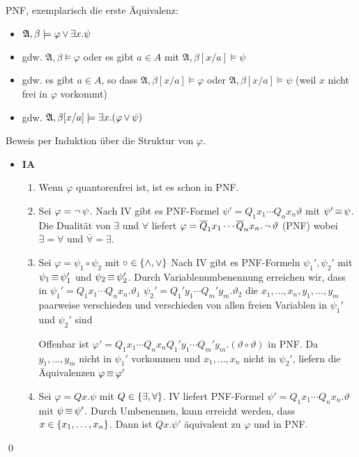 PNF, exemplarisch die erste Äquivalenz:

\begin{itemize}
  \item $\mathfrak{A}, \beta \models \varphi \operatorname{\vee} \exists x.\psi$
  \item gdw. $\mathfrak{A}, \beta \models \varphi$ oder es gibt $a\in A$ mit $\mathfrak{A}, \beta[x/a] \models \psi$
  \item gdw. es gibt $a\in A$, so dass $\mathfrak{A}, \beta[x/a] \models \varphi$ oder $\mathfrak{A}, \beta[x/a] \models \psi$ (weil $x$ nicht frei in $\varphi$ vorkommt)
  \item gdw. $\mathfrak{A}, \beta[x/a] \models \exists x.(\varphi \operatorname{\vee} \psi)$
\end{itemize}

Beweis per Induktion über die Struktur von $\varphi$.
\begin{itemize}
  \item \textbf{IA}
  \begin{enumerate}
    \item Wenn $\varphi$ quantorenfrei ist, ist es schon in PNF.
    \item Sei $\varphi = \operatorname{\neg}\psi$. Nach IV gibt es PNF-Formel $\psi' = Q_1x_1\cdots Q_nx_n \vartheta$ mit $\psi' \operatorname{\equiv} \psi$. Die Dualität von $\exists$ und $\forall$ liefert
      $\varphi = \overline{Q}_1x_1 \cdots \overline{Q}_nx_n.\operatorname{\neg}\vartheta$ (PNF)
    wobei $\overline{\exists}=\forall$ und $\overline{\forall}=\exists$.
    
    \item Sei $\varphi = \psi_1 \circ \psi_2$ mit $\circ\in\left\{\operatorname{\wedge},\operatorname{\vee}\right\}$
    Nach IV gibt es PNF-Formeln $\psi_1', \psi_2'$ mit $\psi_1 \operatorname{\equiv} \psi_1'$
    und $\psi_2 \operatorname{\equiv} \psi_2'$. Durch Variablenumbenennung erreichen wir, dass in
      $\psi_1' = Q_1x_1 \cdots Q_nx_n. \vartheta_1$
      $\psi_2' = Q_1'y_1 \cdots Q_m'y_m. \vartheta_2$
    die $x_1,\dots,x_n, y_1,\dots,y_m$ paarweise verschieden und verschieden von allen freien Variablen in $\psi_1'$ und $\psi_2'$ sind
    
    Offenbar ist
      $\varphi' = Q_1x_1\cdots Q_nx_n Q_1'y_1 \cdots Q_m'y_m .(\vartheta\circ\vartheta)$
    in PNF. Da $y_1,\dots,y_m$ nicht in $\psi_1'$ vorkommen und $x_1,\dots,x_n$ nicht in $\psi_2'$, liefern die Äquivalenzen $\varphi \operatorname{\equiv} \varphi'$
    
    \item Sei $\varphi = Q x.\psi$ mit $Q \in\left\{\exists, \forall\right\}$.
    IV liefert PNF-Formel $\psi'=Q_1x_1\cdots Q_nx_n.\vartheta$
    mit $\psi \operatorname{\equiv} \psi'$. Durch Umbenennen, kann erreicht werden,
    dass $x \in \left\{x_1,\dots,x_n\right\}$. Dann ist $Q x.\psi'$ äquivalent zu $\varphi$ und in PNF.
  \end{enumerate}
\end{itemize}
\qed



